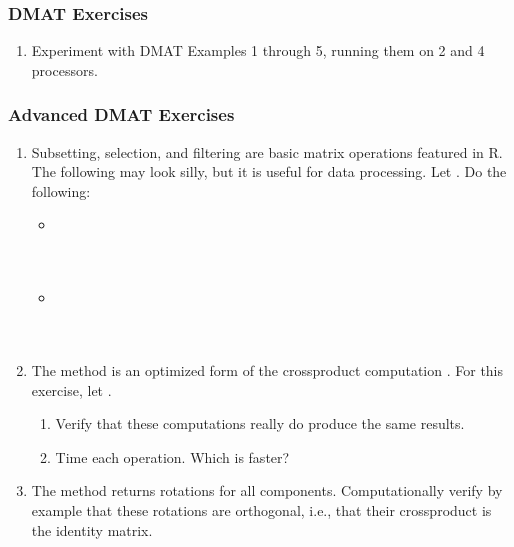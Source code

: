 \begin{frame}
\frametitle{DMAT Exercises}
\begin{enumerate}
  \item Experiment with DMAT Examples 1 through 5, running them on 2 and 4 processors.
\end{enumerate}
\end{frame}



\begin{frame}[fragile,allowframebreaks=.9]
\frametitle{Advanced DMAT Exercises}
\begin{enumerate}
  \item  Subsetting, selection, and filtering are basic matrix operations featured
  in R. The following may look silly, but it is useful for data
  processing.  Let .  Do the following:
  \begin{itemize}
  \item
     \\
     \\
  \\[.2cm]
  \item
     \\
     \\
     \\
  \end{itemize}

  \item The method  is an optimized form of the crossproduct computation .  For this exercise, let .
  \begin{enumerate}
    \item Verify that these computations really do produce the same results.
    \item Time each operation.  Which is faster?
  \end{enumerate}

  \item The  method returns rotations for all components.  Computationally verify by example that these rotations are orthogonal, i.e., that their crossproduct is the identity matrix.

\end{enumerate}
\end{frame}